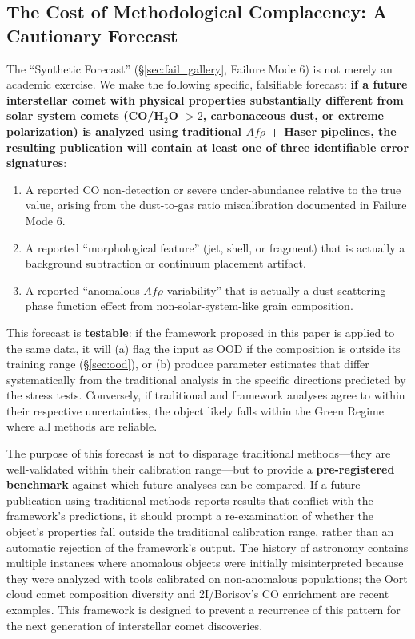 \documentclass[usenatbib]{mnras}
\begin{document}
\subsection{The Cost of Methodological Complacency: A Cautionary Forecast}

The ``Synthetic Forecast'' (\S\ref{sec:fail_gallery}, Failure Mode 6) is not merely an academic exercise. We make the following specific, falsifiable forecast: \textbf{if a future interstellar comet with physical properties substantially different from solar system comets (CO/H$_2$O $> 2$, carbonaceous dust, or extreme polarization) is analyzed using traditional $Af\rho$ + Haser pipelines, the resulting publication will contain at least one of three identifiable error signatures}:

\begin{enumerate}
    \item A reported CO non-detection or severe under-abundance relative to the true value, arising from the dust-to-gas ratio miscalibration documented in Failure Mode 6.
    \item A reported ``morphological feature'' (jet, shell, or fragment) that is actually a background subtraction or continuum placement artifact.
    \item A reported ``anomalous $Af\rho$ variability'' that is actually a dust scattering phase function effect from non-solar-system-like grain composition.
\end{enumerate}

This forecast is \textbf{testable}: if the framework proposed in this paper is applied to the same data, it will (a) flag the input as OOD if the composition is outside its training range (\S\ref{sec:ood}), or (b) produce parameter estimates that differ systematically from the traditional analysis in the specific directions predicted by the stress tests. Conversely, if traditional and framework analyses agree to within their respective uncertainties, the object likely falls within the Green Regime where all methods are reliable.

The purpose of this forecast is not to disparage traditional methods---they are well-validated within their calibration range---but to provide a \textbf{pre-registered benchmark} against which future analyses can be compared. If a future publication using traditional methods reports results that conflict with the framework's predictions, it should prompt a re-examination of whether the object's properties fall outside the traditional calibration range, rather than an automatic rejection of the framework's output. The history of astronomy contains multiple instances where anomalous objects were initially misinterpreted because they were analyzed with tools calibrated on non-anomalous populations; the Oort cloud comet composition diversity and 2I/Borisov's CO enrichment are recent examples. This framework is designed to prevent a recurrence of this pattern for the next generation of interstellar comet discoveries.
\end{document}

